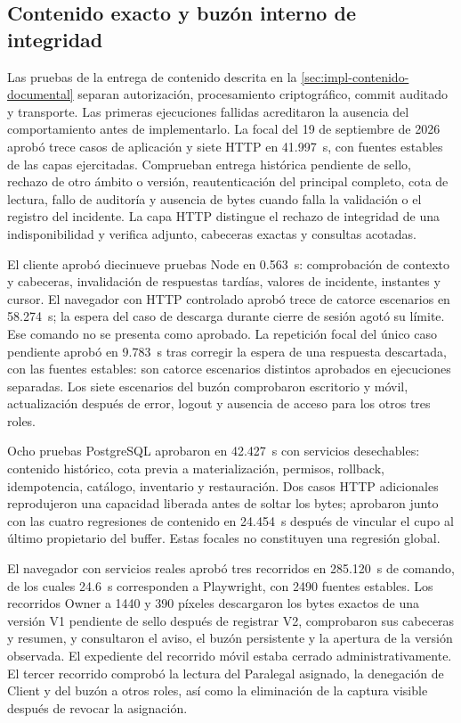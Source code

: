 \subsection{Contenido exacto y buzón interno de integridad}\label{sec:pruebas-contenido-documental}

Las pruebas de la entrega de contenido descrita en la \cref{sec:impl-contenido-documental} separan autorización, procesamiento criptográfico, commit auditado y transporte. Las primeras ejecuciones fallidas acreditaron la ausencia del comportamiento antes de implementarlo. La focal del 19 de septiembre de 2026 aprobó trece casos de aplicación y siete HTTP en 41.997~s, con fuentes estables de las capas ejercitadas. Comprueban entrega histórica pendiente de sello, rechazo de otro ámbito o versión, reautenticación del principal completo, cota de lectura, fallo de auditoría y ausencia de bytes cuando falla la validación o el registro del incidente. La capa HTTP distingue el rechazo de integridad de una indisponibilidad y verifica adjunto, cabeceras exactas y consultas acotadas.

El cliente aprobó diecinueve pruebas Node en 0.563~s: comprobación de contexto y cabeceras, invalidación de respuestas tardías, valores de incidente, instantes y cursor. El navegador con HTTP controlado aprobó trece de catorce escenarios en 58.274~s; la espera del caso de descarga durante cierre de sesión agotó su límite. Ese comando no se presenta como aprobado. La repetición focal del único caso pendiente aprobó en 9.783~s tras corregir la espera de una respuesta descartada, con las fuentes estables: son catorce escenarios distintos aprobados en ejecuciones separadas. Los siete escenarios del buzón comprobaron escritorio y móvil, actualización después de error, logout y ausencia de acceso para los otros tres roles.

Ocho pruebas PostgreSQL aprobaron en 42.427~s con servicios desechables: contenido histórico, cota previa a materialización, permisos, rollback, idempotencia, catálogo, inventario y restauración. Dos casos HTTP adicionales reprodujeron una capacidad liberada antes de soltar los bytes; aprobaron junto con las cuatro regresiones de contenido en 24.454~s después de vincular el cupo al último propietario del buffer. Estas focales no constituyen una regresión global.

El navegador con servicios reales aprobó tres recorridos en 285.120~s de comando, de los cuales 24.6~s corresponden a Playwright, con 2490 fuentes estables. Los recorridos Owner a 1440 y 390 píxeles descargaron los bytes exactos de una versión V1 pendiente de sello después de registrar V2, comprobaron sus cabeceras y resumen, y consultaron el aviso, el buzón persistente y la apertura de la versión observada. El expediente del recorrido móvil estaba cerrado administrativamente. El tercer recorrido comprobó la lectura del Paralegal asignado, la denegación de Client y del buzón a otros roles, así como la eliminación de la captura visible después de revocar la asignación.

